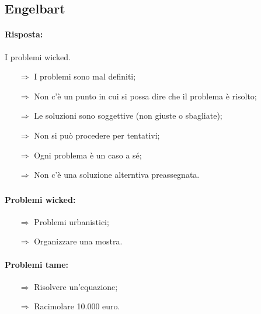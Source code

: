 \subsection{Engelbart}


\paragraph{Risposta:} I problemi wicked.

\begin{itemize}
    \item [$\Rightarrow$] I problemi sono mal definiti;
    \item [$\Rightarrow$] Non c'è un punto in cui si possa dire che il problema è risolto;
    \item [$\Rightarrow$] Le soluzioni sono soggettive (non giuste o sbagliate);
    \item [$\Rightarrow$] Non si può procedere per tentativi;
    \item [$\Rightarrow$] Ogni problema è un caso a sé;
    \item [$\Rightarrow$] Non c'è una soluzione alterntiva preassegnata.
\end{itemize}

\subsubsection{}


\paragraph{Problemi wicked:}

\begin{itemize}
    \item [$\Rightarrow$] Problemi urbanistici;
    \item [$\Rightarrow$] Organizzare una mostra.
\end{itemize}

\paragraph{Problemi tame:}

\begin{itemize}
    \item [$\Rightarrow$] Risolvere un'equazione;
    \item [$\Rightarrow$] Racimolare 10.000 euro.
\end{itemize}

